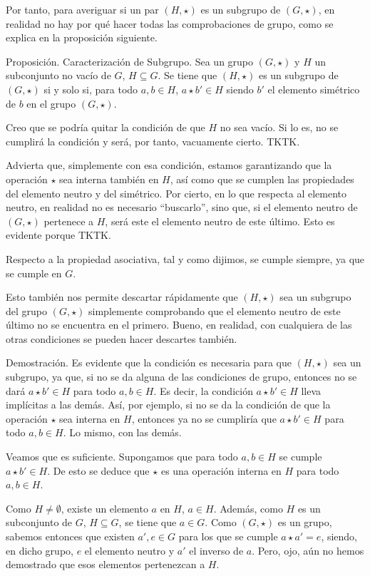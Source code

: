 Por tanto, para averiguar si un par $(H, \star)$ es un subgrupo de $(G,
\star)$, en realidad no hay por qué hacer todas las comprobaciones de grupo,
como se explica en la proposición siguiente.

Proposición. Caracterización de Subgrupo. Sea un grupo $(G, \star)$ y $H$ un
subconjunto no vacío de $G$, $H \subseteq G$. Se tiene que $(H, \star)$ es
un subgrupo de $(G, \star)$ si y solo si, para todo $a, b \in H$, $a \star
b' \in H$ siendo $b'$ el elemento simétrico de $b$ en el grupo $(G, \star)$.


Creo que se podría quitar la condición de que $H$ no sea vacío. Si lo es, no
se cumplirá la condición y será, por tanto, vacuamente cierto. TKTK.

Advierta que, simplemente con esa condición, estamos garantizando que la
operación $\star$ sea interna también en $H$, así como que se cumplen las
propiedades del elemento neutro y del simétrico. Por cierto, en lo que
respecta al elemento neutro, en realidad no es necesario ``buscarlo'', sino
que, si el elemento neutro de $(G, \star)$ pertenece a $H$, será este el
elemento neutro de este último. Esto es evidente porque TKTK.

Respecto a la propiedad asociativa, tal y como dijimos, se cumple siempre,
ya que se cumple en $G$.

Esto también nos permite descartar rápidamente que $(H, \star)$ sea un
subgrupo del grupo $(G, \star)$ simplemente comprobando que el elemento
neutro de este último no se encuentra en el primero. Bueno, en realidad, con
cualquiera de las otras condiciones se pueden hacer descartes también.

Demostración. Es evidente que la condición es necesaria para que $(H,
\star)$ sea un subgrupo, ya que, si no se da alguna de las condiciones de
grupo, entonces no se dará $a \star b' \in H$ para todo $a, b \in H$. Es
decir, la condición $a \star b' \in H$ lleva implícitas a las demás. Así,
por ejemplo, si no se da la condición de que la operación $\star$ sea
interna en $H$, entonces ya no se cumpliría que $a \star b' \in H$ para todo
$a, b \in H$. Lo mismo, con las demás.

Veamos que es suficiente. Supongamos que para todo $a, b \in H$ se cumple $a
\star b' \in H$. De esto se deduce que $\star$ es una operación interna en
$H$ para todo $a, b \in H$.

Como $H \neq \emptyset$, existe un elemento $a$ en $H$, $a \in H$. Además,
como $H$ es un subconjunto de $G$, $H \subseteq G$, se tiene que $a \in G$.
Como $(G, \star)$ es un grupo, sabemos entonces que existen $a', e \in G$
para los que se cumple $a \star a' = e$, siendo, en dicho grupo, $e$ el
elemento neutro y $a'$ el inverso de $a$. Pero, ojo, aún no hemos demostrado
que esos elementos pertenezcan a $H$.

